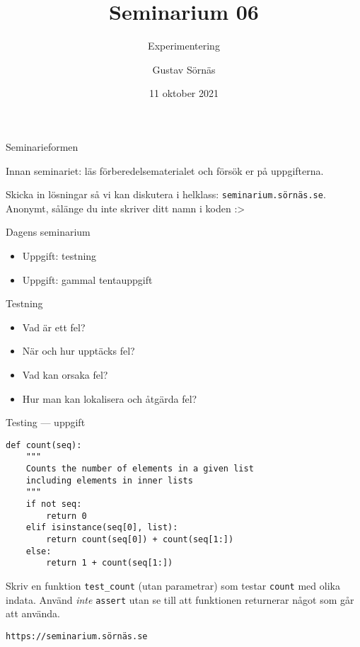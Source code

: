 \documentclass{beamer}
\title{Seminarium 06}
\subtitle{Experimentering}
\date{11 oktober 2021}
\author{Gustav Sörnäs}
\begin{document}
  \frame{\titlepage}

  \begin{frame}{Seminarieformen}

    Innan seminariet: läs förberedelsematerialet och försök er på uppgifterna.

    Skicka in lösningar så vi kan diskutera i helklass:
    \texttt{seminarium.sörnäs.se}. Anonymt, sålänge du inte skriver ditt namn i
    koden :>

  \end{frame}

  \begin{frame}{Dagens seminarium}

    \begin{itemize}
      \item Uppgift: testning
      \item Uppgift: gammal tentauppgift
    \end{itemize}

  \end{frame}

  \begin{frame}{Testning}

    \begin{itemize}
      \item Vad är ett fel?
      \item När och hur upptäcks fel?
      \item Vad kan orsaka fel?
      \item Hur man kan lokalisera och åtgärda fel?
    \end{itemize}

  \end{frame}

  \begin{frame}[fragile]{Testing --- uppgift}

    \begin{lstlisting}
def count(seq):
    """
    Counts the number of elements in a given list
    including elements in inner lists
    """
    if not seq:
        return 0
    elif isinstance(seq[0], list):
        return count(seq[0]) + count(seq[1:])
    else:
        return 1 + count(seq[1:])
    \end{lstlisting}

    {\small Skriv en funktion \texttt{test\_count} (utan parametrar) som testar
    \texttt{count} med olika indata. Använd \emph{inte} \texttt{assert} utan se till
    att funktionen returnerar något som går att använda.

    \texttt{https://seminarium.sörnäs.se}}


  \end{frame}
\end{document}
